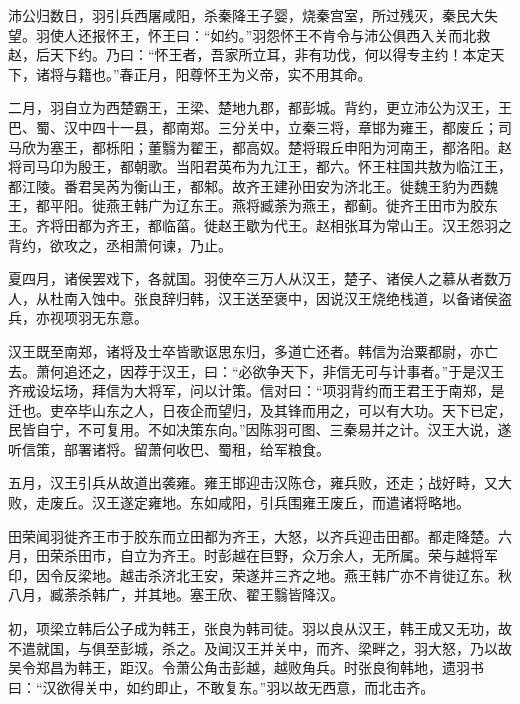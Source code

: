 \documentclass[12pt,UTF8]{ctexbook}
\begin{document}
沛公归数日，羽引兵西屠咸阳，杀秦降王子婴，烧秦宫室，所过残灭，秦民大失望。羽使人还报怀王，怀王曰：“如约。”羽怨怀王不肯令与沛公俱西入关而北救赵，后天下约。乃曰：“怀王者，吾家所立耳，非有功伐，何以得专主约！本定天下，诸将与籍也。”春正月，阳尊怀王为义帝，实不用其命。



二月，羽自立为西楚霸王，王梁、楚地九郡，都彭城。背约，更立沛公为汉王，王巴、蜀、汉中四十一县，都南郑。三分关中，立秦三将，章邯为雍王，都废丘；司马欣为塞王，都栎阳；董翳为翟王，都高奴。楚将瑕丘申阳为河南王，都洛阳。赵将司马卬为殷王，都朝歌。当阳君英布为九江王，都六。怀王柱国共敖为临江王，都江陵。番君吴芮为衡山王，都邾。故齐王建孙田安为济北王。徙魏王豹为西魏王，都平阳。徙燕王韩广为辽东王。燕将臧荼为燕王，都蓟。徙齐王田市为胶东王。齐将田都为齐王，都临菑。徙赵王歇为代王。赵相张耳为常山王。汉王怨羽之背约，欲攻之，丞相萧何谏，乃止。



夏四月，诸侯罢戏下，各就国。羽使卒三万人从汉王，楚子、诸侯人之慕从者数万人，从杜南入蚀中。张良辞归韩，汉王送至褒中，因说汉王烧绝栈道，以备诸侯盗兵，亦视项羽无东意。



汉王既至南郑，诸将及士卒皆歌讴思东归，多道亡还者。韩信为治粟都尉，亦亡去。萧何追还之，因荐于汉王，曰：“必欲争天下，非信无可与计事者。”于是汉王齐戒设坛场，拜信为大将军，问以计策。信对曰：“项羽背约而王君王于南郑，是迁也。吏卒毕山东之人，日夜企而望归，及其锋而用之，可以有大功。天下已定，民皆自宁，不可复用。不如决策东向。”因陈羽可图、三秦易并之计。汉王大说，遂听信策，部署诸将。留萧何收巴、蜀租，给军粮食。



五月，汉王引兵从故道出袭雍。雍王邯迎击汉陈仓，雍兵败，还走；战好畤，又大败，走废丘。汉王遂定雍地。东如咸阳，引兵围雍王废丘，而遣诸将略地。



田荣闻羽徙齐王市于胶东而立田都为齐王，大怒，以齐兵迎击田都。都走降楚。六月，田荣杀田市，自立为齐王。时彭越在巨野，众万余人，无所属。荣与越将军印，因令反梁地。越击杀济北王安，荣遂并三齐之地。燕王韩广亦不肯徙辽东。秋八月，臧荼杀韩广，并其地。塞王欣、翟王翳皆降汉。



初，项梁立韩后公子成为韩王，张良为韩司徒。羽以良从汉王，韩王成又无功，故不遣就国，与俱至彭城，杀之。及闻汉王并关中，而齐、梁畔之，羽大怒，乃以故吴令郑昌为韩王，距汉。令萧公角击彭越，越败角兵。时张良徇韩地，遗羽书曰：“汉欲得关中，如约即止，不敢复东。”羽以故无西意，而北击齐。
\end{document}
